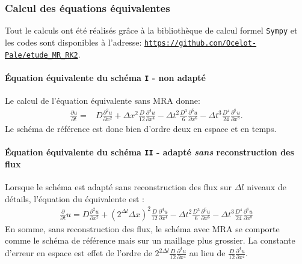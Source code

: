 \subsubsection{Calcul des équations équivalentes}
Tout le calculs ont été réalisés grâce à la bibliothèque de calcul formel \texttt{Sympy} et les codes 
sont disponibles à l'adresse: \href{https://github.com/Ocelot-Pale/etude_MR_RK2}{\nolinkurl{https://github.com/Ocelot-Pale/etude_MR_RK2}}.
\paragraph{Équation équivalente du schéma \texttt{I} - non adapté}
    Le calcul de l'équation équivalente sans MRA donne:
    \begin{align}
        \frac{\partial u}{\partial t}  =&D \frac{\partial^{2}u}{\partial x^{2}}
        + \Delta x^{2} \frac{D}{12}             \frac{\partial^{4}u}{\partial x^{4}} 
        -  \Delta t^{2} \frac{D^{3}}{6}          \frac{\partial^{6}u}{\partial x^{6}} 
        -  \Delta t^{3} \frac{D^{4}}{24}        \frac{\partial^{8}u}{\partial x^{8}}.
    \end{align}
    Le schéma de référence est donc bien d'ordre deux en espace et en temps.
\paragraph{Équation équivalente du schéma \texttt{II} - adapté \emph{sans} reconstruction des flux}
    Lorsque le schéma est adapté sans reconstruction des flux sur $\Delta l$ niveaux de détails,
    l'équation du équivalente est :
    \begin{align}
        \frac{\partial}{\partial t} u=
            D \frac{\partial^{2}u}{\partial x^{2}}
            + (2^{\Delta l} \Delta x)^{2}  \frac{D}{12} \frac{\partial^{4}u}{\partial x^{4}}
            -\Delta t^{2} \frac{D^{3}}{6}   \frac{\partial^{6}u}{\partial x^{6}}
            -\Delta t^{3} \frac{D^{4} }{24} \frac{\partial^{8}u}{\partial x^{8}}
    \end{align}
    En somme, sans reconstruction des flux, le schéma avec MRA se comporte comme le schéma de référence mais sur un maillage plus grossier. 
    La constante d'erreur en espace est effet de l'ordre de $2^{2\Delta l} \frac{D}{12} \frac{\partial^{4}u}{\partial x^{4}}$ 
    au lieu de $\frac{D}{12}\frac{\partial^{4}u}{\partial x^{4}}$.
